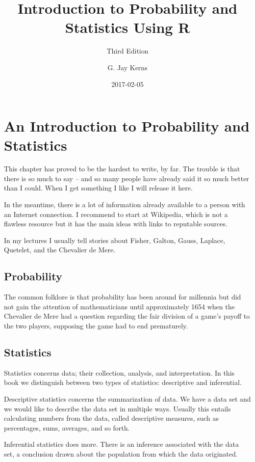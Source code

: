 \documentclass[]{book}
\title{Introduction to Probability and Statistics Using R}
\author{G. Jay Kerns}
\date{2017-02-05}
\subtitle{Third Edition}
\numberwithin{equation}{chapter}
\numberwithin{figure}{chapter}
\theoremstyle{plain}
\theoremstyle{definition}
\theoremstyle{remark}
\theoremstyle{definition}
\theoremstyle{definition}
\theoremstyle{remark}
\begin{document}
\maketitle

{
\setcounter{tocdepth}{1}
\tableofcontents
}
\chapter{An Introduction to Probability and
Statistics}\label{cha-introps}

This chapter has proved to be the hardest to write, by far. The trouble
is that there is so much to say -- and so many people have already said
it so much better than I could. When I get something I like I will
release it here.

In the meantime, there is a lot of information already available to a
person with an Internet connection. I recommend to start at Wikipedia,
which is not a flawless resource but it has the main ideas with links to
reputable sources.

In my lectures I usually tell stories about Fisher, Galton, Gauss,
Laplace, Quetelet, and the Chevalier de Mere.

\section{Probability}\label{probability}

The common folklore is that probability has been around for millennia
but did not gain the attention of mathematicians until approximately
1654 when the Chevalier de Mere had a question regarding the fair
division of a game's payoff to the two players, supposing the game had
to end prematurely.

\section{Statistics}\label{statistics}

Statistics concerns data; their collection, analysis, and
interpretation. In this book we distinguish between two types of
statistics: descriptive and inferential.

Descriptive statistics concerns the summarization of data. We have a
data set and we would like to describe the data set in multiple ways.
Usually this entails calculating numbers from the data, called
descriptive measures, such as percentages, sums, averages, and so forth.

Inferential statistics does more. There is an inference associated with
the data set, a conclusion drawn about the population from which the
data originated.
\end{document}
